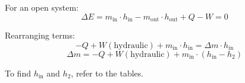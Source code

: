 For an open system:  
\[
\Delta E = m_{\text{in}} \cdot h_{\text{in}} - m_{\text{out}} \cdot h_{\text{out}} + Q - W = 0
\]  

Rearranging terms:  
\[
-Q + W (\text{hydraulic}) + m_{\text{in}} \cdot h_{\text{in}} = \Delta m \cdot h_{\text{in}}  
\]  
\[
\Delta m = -Q + W (\text{hydraulic}) + m_{\text{in}} \cdot (h_{\text{in}} - h_2)  
\]  

To find \( h_{\text{in}} \) and \( h_2 \), refer to the tables.